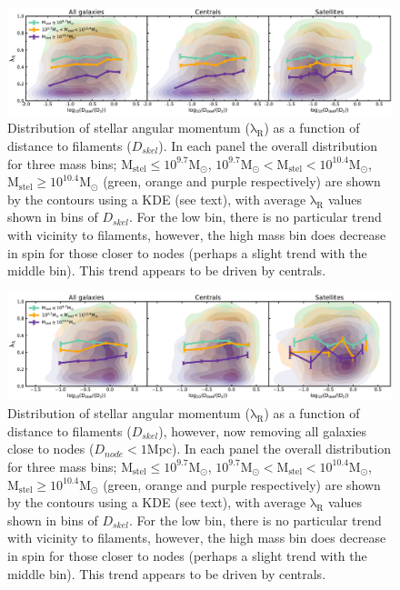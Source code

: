 \begin{figure}
    \centering\includegraphics[width=\linewidth]{thesis/latex/cw_spin/lambdaR_dskel_mass_split_3sigma.pdf}
    \caption{Distribution of stellar angular momentum ($\mathrm{\lambda_R}$) as a function of distance to filaments ($D_{skel}$). In each panel the overall distribution for three mass bins; $\mathrm{M_{stel} \leq 10^{9.7} M_{\odot}}$, $\mathrm{10^{9.7}M_{\odot} < M_{stel} < 10^{10.4}M_{\odot}}$, $\mathrm{M_{stel} \geq 10^{10.4}M_{\odot}}$ (green, orange and purple respectively) are shown by the contours using a KDE (see text), with average $\mathrm{\lambda_R}$ values shown in bins of $D_{skel}$. For the low bin, there is no particular trend with vicinity to filaments, however, the high mass bin does decrease in spin for those closer to nodes (perhaps a slight trend with the middle bin). This trend appears to be driven by centrals.}
\label{fig:}
\end{figure} 

\begin{figure}
    \centering\includegraphics[width=\linewidth]{thesis/latex/cw_spin/lambdaR_dskel_no_node_mass_split_3sigma.pdf}
    \caption{Distribution of stellar angular momentum ($\mathrm{\lambda_R}$) as a function of distance to filaments ($D_{skel}$), however, now removing all galaxies close to nodes ($D_{node} < 1$Mpc). In each panel the overall distribution for three mass bins; $\mathrm{M_{stel} \leq 10^{9.7} M_{\odot}}$, $\mathrm{10^{9.7}M_{\odot} < M_{stel} < 10^{10.4}M_{\odot}}$, $\mathrm{M_{stel} \geq 10^{10.4}M_{\odot}}$ (green, orange and purple respectively) are shown by the contours using a KDE (see text), with average $\mathrm{\lambda_R}$ values shown in bins of $D_{skel}$. For the low bin, there is no particular trend with vicinity to filaments, however, the high mass bin does decrease in spin for those closer to nodes (perhaps a slight trend with the middle bin). This trend appears to be driven by centrals.}
\label{fig:}
\end{figure} 

